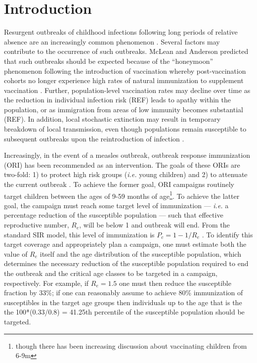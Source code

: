 \section{Introduction}\label{introduction}

Resurgent outbreaks of childhood infections following long periods of
relative absence are an increasingly common phenomenon \cite{Hersh_1991, Cherry_2012, Celentano_2005, Shibeshi_2014}. Several factors may contribute to the occurrence of
such outbreaks. McLean and Anderson \cite{McLean_1988} predicted that such
outbreaks should be expected because of the ``honeymoon'' phenomenon
following the introduction of vaccination whereby post-vaccination
cohorts no longer experience high rates of natural immunization to
supplement vaccination \cite{Jansen_2003}. Further, population-level vaccination rates may
decline over time as the reduction in individual infection risk (REF)
leads to apathy within the population, or as immigration from areas of
low immunity becomes substantial (REF). In addition, local stochastic
extinction may result in temporary breakdown of local transmission, even
though populations remain susceptible to subsequent outbreaks upon the
reintroduction of infection \cite{Ferrari_2008}.

Increasingly, in the event of a measles outbreak, outbreak response
immunization (ORI) has been recommended as an intervention. The goals of
these ORIs are two-fold: 1) to protect high risk groups (\emph{i.e.}
young children) and 2) to attenuate the current outbreak \cite{Cairns_2011,Grais_2011} . To achieve the former goal, ORI campaigns routinely
target children between the ages of 9-59 months of age\footnote{though
  there has been increasing discussion about vaccinating children from
  6-9m}. To achieve the latter goal, the campaign must reach some
target level of immunization --- \emph{i.e.} a percentage reduction of
the susceptible population --- such that effective reproductive number,
\(R_e\), will be below 1 and outbreak will end. From the standard SIR
model, this level of immunization is \(P_c = 1-1/R_e\) \cite{Anderson_1981}. To identify this target coverage and appropriately plan a campaign, one must estimate
both the value of \(R_e\) itself and the age distribution of the
susceptible population, which determines the necessary reduction of
the susceptible population required to end the outbreak and the
critical age classes to be targeted in a campaign, respectively.
For example, if \(R_e=1.5\) one must then reduce the
susceptible fraction by 33\%; if one can reasonably assume to achieve
80\% immunization of susceptibles in the target age groups then individuals up to the age that is the the
100*(0.33/0.8) = 41.25th percentile of the susceptible population should be targeted.

